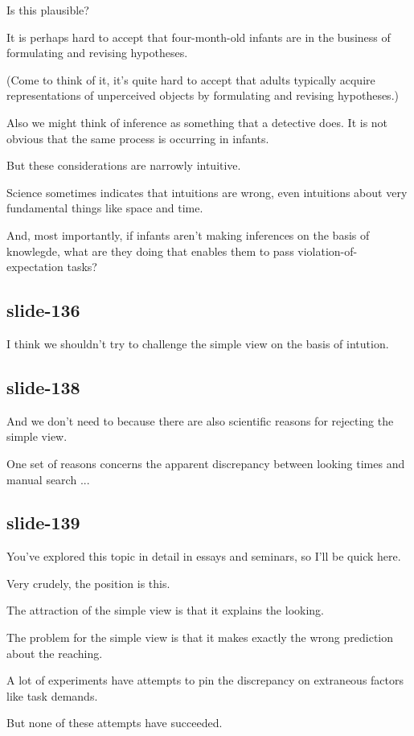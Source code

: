 \documentclass[12pt,\papersize]{extarticle}
\begin{document}
Is this plausible?
 
It is perhaps hard to accept that four-month-old infants are in the business of formulating and revising hypotheses.
 
(Come to think of it, it’s quite hard to accept that adults typically acquire representations of unperceived objects by formulating and revising hypotheses.)
 
Also we might think of inference as something that a detective does.  It is not obvious that the same process is occurring in infants.
 
But these considerations are narrowly intuitive.
 
Science sometimes indicates that intuitions are wrong, even intuitions about very fundamental things like space and time.
 
And, most importantly, if infants aren’t making inferences on the basis of knowlegde, what are they doing that enables them to pass violation-of-expectation tasks?
 
\subsection{slide-136}
I think we shouldn't try to challenge the simple view on the basis of intution.
 
\subsection{slide-138}
And we don't need to because there are also scientific reasons for rejecting the simple view.
 
One set of reasons concerns the apparent discrepancy between looking times and manual search ...
 
\subsection{slide-139}
You've explored this topic in detail in essays and seminars, so I'll be quick here.
 
Very crudely, the position is this.
 
The attraction of the simple view is that it explains the looking.
 
The problem for the simple view is that it makes exactly the wrong prediction about the reaching.
 
A lot of experiments have attempts to pin the discrepancy on extraneous factors like task demands.
 
But none of these attempts have succeeded.
 
\end{document}
